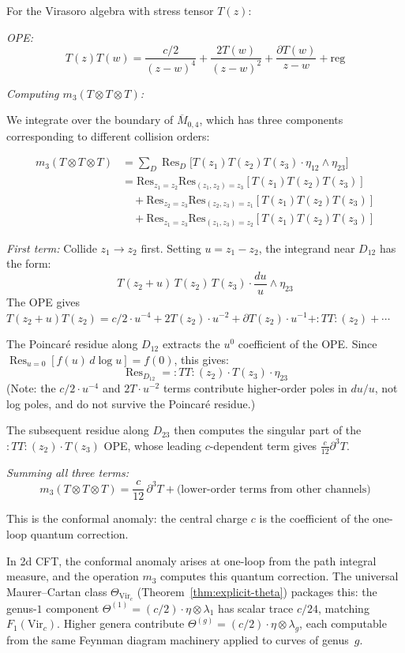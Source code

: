 \begin{computation}
\label{comp:virasoro-m3}
For the Virasoro algebra with stress tensor $T(z)$:

\emph{OPE:}
\[T(z)T(w) = \frac{c/2}{(z-w)^4} + \frac{2T(w)}{(z-w)^2} + \frac{\partial T(w)}{z-w}
+ \text{reg}\]

\emph{Computing $m_3(T \otimes T \otimes T)$:}

We integrate over the boundary of $\overline{M}_{0,4}$, which has three components 
corresponding to different collision orders:

\begin{align*}
m_3(T \otimes T \otimes T) &= \sum_{D} \operatorname{Res}_D\bigl[
T(z_1)T(z_2)T(z_3) \cdot \eta_{12} \wedge \eta_{23}\bigr] \\
&= \text{Res}_{z_1=z_2}\text{Res}_{(z_1,z_2)=z_3}[T(z_1)T(z_2)T(z_3)] \\
&\quad + \text{Res}_{z_2=z_3}\text{Res}_{(z_2,z_3)=z_1}[T(z_1)T(z_2)T(z_3)] \\
&\quad + \text{Res}_{z_1=z_3}\text{Res}_{(z_1,z_3)=z_2}[T(z_1)T(z_2)T(z_3)]
\end{align*}

\emph{First term:} Collide $z_1 \to z_2$ first.  Setting $u = z_1 - z_2$, the integrand near $D_{12}$ has the form:
\[T(z_2+u)\,T(z_2)\,T(z_3) \cdot \frac{du}{u} \wedge \eta_{23}\]
The OPE gives $T(z_2+u)T(z_2) = c/2 \cdot u^{-4} + 2T(z_2) \cdot u^{-2} + \partial T(z_2) \cdot u^{-1} + {:}TT{:}(z_2) + \cdots$

The Poincar\'e residue along $D_{12}$ extracts the $u^0$ coefficient of the OPE.
Since $\operatorname{Res}_{u=0}[f(u)\,d\log u] = f(0)$, this gives:
\[\operatorname{Res}_{D_{12}} = {:}TT{:}(z_2) \cdot T(z_3) \cdot \eta_{23}\]
(Note: the $c/2 \cdot u^{-4}$ and $2T \cdot u^{-2}$ terms contribute
higher-order poles in $du/u$, not log poles, and do not survive
the Poincar\'e residue.)

The subsequent residue along $D_{23}$ then computes the singular part of the ${:}TT{:}(z_2) \cdot T(z_3)$ OPE, whose leading $c$-dependent term gives $\frac{c}{12}\partial^3 T$.

\emph{Summing all three terms:}
\[m_3(T \otimes T \otimes T) = \frac{c}{12}\,\partial^3 T + \text{(lower-order terms from other channels)}\]

This is the conformal anomaly: the central charge $c$ is the coefficient of
the one-loop quantum correction.

In 2d CFT, the conformal anomaly arises at one-loop
from the path integral measure, and the operation $m_3$ computes this quantum correction.
The universal Maurer--Cartan class $\Theta_{\mathrm{Vir}_c}$
(Theorem~\ref{thm:explicit-theta}) packages this: the genus-$1$
component $\Theta^{(1)} = (c/2) \cdot \eta \otimes \lambda_1$
has scalar trace $c/24$, matching $F_1(\mathrm{Vir}_c)$.  Higher
genera contribute $\Theta^{(g)} = (c/2)\cdot\eta\otimes\lambda_g$,
each computable from the same Feynman diagram machinery applied to
curves of genus~$g$.
\end{computation}

